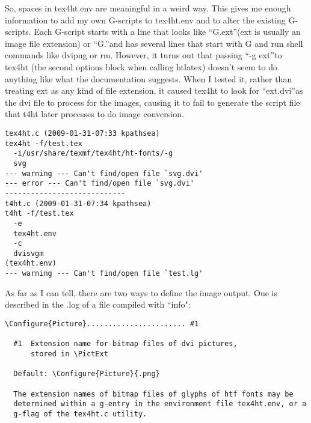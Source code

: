 \documentclass[12pt]{article}
\begin{document}
So, spaces in tex4ht.env are meaningful in a weird way.  This gives me
enough information to add my own G-scripts to tex4ht.env and to alter
the existing G-scripts.  Each G-script starts with a line that looks
like ``G.ext''(ext is usually an image file extension) or ``G.''and has
several lines that start with G and run shell commands like dvipng or
rm.  However, it turns out that passing ``-g ext''to tex4ht (the second
options block when calling htlatex) doesn't seem to do anything like
what the documentation suggests.  When I tested it, rather than
treating ext as any kind of file extension, it caused tex4ht to look
for ``ext.dvi''as the dvi file to process for the images, causing it to
fail to generate the script file that t4ht later processes to do image
conversion.

\begin{lstlisting}
tex4ht.c (2009-01-31-07:33 kpathsea)
tex4ht -f/test.tex 
  -i/usr/share/texmf/tex4ht/ht-fonts/-g 
  svg 
--- warning --- Can't find/open file `svg.dvi'
--- error --- Can't find/open file `svg.dvi'
----------------------------
t4ht.c (2009-01-31-07:34 kpathsea)
t4ht -f/test.tex 
  -e 
  tex4ht.env 
  -c 
  dvisvgm 
(tex4ht.env)
--- warning --- Can't find/open file `test.lg'
\end{lstlisting}

As far as I can tell, there are two ways to define the image output.
One is described in the .log of a file compiled with ``info":

\begin{lstlisting}
\Configure{Picture}....................... #1

  #1  Extension name for bitmap files of dvi pictures,
      stored in \PictExt

  Default: \Configure{Picture}{.png}

  The extension names of bitmap files of glyphs of htf fonts may be
  determined within a g-entry in the environment file tex4ht.env, or a
  g-flag of the tex4ht.c utility.
\end{lstlisting}
\end{document}
